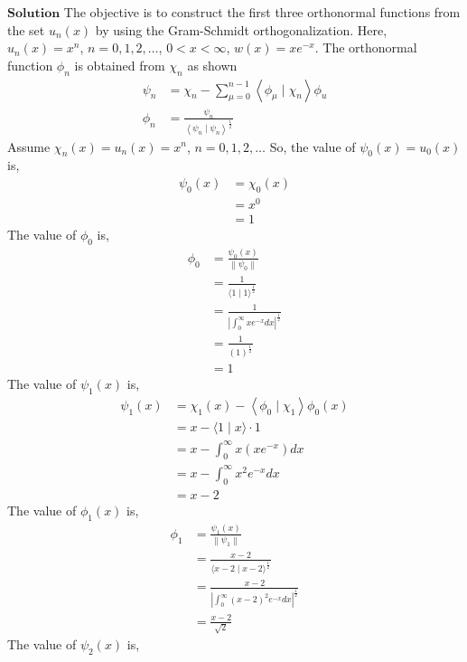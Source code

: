 $\boxed{\textbf{Solution}}$ The objective is to construct the first three orthonormal functions from the set $u_{n}(x)$ by using the
Gram-Schmidt orthogonalization. Here, $u_{n}(x)=x^{n}$, $n=0,1,2, \ldots$, $0<x<\infty$, $w(x)=x e^{-x}$. The orthonormal function $\phi_{n}$ is obtained from $\chi_{n}$ as shown
$$
\begin{aligned}
\psi_{n} &=\chi_{n}-\sum_{\mu=0}^{n-1}\left\langle\phi_{\mu} \mid \chi_{n}\right\rangle \phi_{u} \\
\phi_{n} &=\frac{\psi_{n}}{\left\langle\psi_{n} \mid \psi_{n}\right\rangle^{\frac{1}{2}}}
\end{aligned}
$$
Assume $\chi_{n}(x)=u_{n}(x)=x^{n}$, $n=0,1,2, \ldots$ So, the value of $\psi_{0}(x)=u_{0}(x)$ is,
$$
\begin{aligned}
\psi_{0}(x) &=\chi_{0}(x) \\
&=x^{0} \\
&=1
\end{aligned}
$$
The value of $\phi_{0}$ is,
$$
\begin{aligned}
\phi_{0} &=\frac{\psi_{0}(x)}{\left\|\psi_{0}\right\|} \\
&=\frac{1}{\langle 1 \mid 1\rangle^{\frac{1}{2}}} \\
&=\frac{1}{\left|\int_{0}^{\infty} x e^{-x} d x\right|^{\frac{1}{2}}} \\
&=\frac{1}{(1)^{\frac{1}{2}}} \\
&=1
\end{aligned}
$$
The value of $\psi_{1}(x)$ is,
$$
\begin{aligned}
\psi_{1}(x) &=\chi_{1}(x)-\left\langle\phi_{0} \mid \chi_{1}\right\rangle \phi_{0}(x) \\
&=x-\langle 1 \mid x\rangle \cdot 1 \\
&=x-\int_{0}^{\infty} x\left(x e^{-x}\right) d x \\
&=x-\int_{0}^{\infty} x^{2} e^{-x} d x \\
&=x-2
\end{aligned}
$$
The value of $\phi_{1}(x)$ is,
$$
\begin{aligned}
\phi_{1} &=\frac{\psi_{1}(x)}{\left\|\psi_{1}\right\|} \\
&=\frac{x-2}{\langle x-2 \mid x-2\rangle^{\frac{1}{2}}} \\
&=\frac{x-2}{\left|\int_{0}^{\infty}(x-2)^{2} e^{-x} d x\right|^{\frac{1}{2}}} \\
&=\frac{x-2}{\sqrt{2}}
\end{aligned}
$$
The value of $\psi_{2}(x)$ is,

